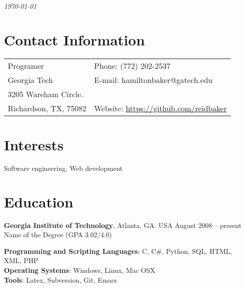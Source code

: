 \documentclass[margin,line]{res}
\begin{document}
 \hfill {\em \today}

\begin{resume}
\section{\sc Contact Information}

\vspace{.05in}
\begin{tabular}{@{}p{3.5in}p{3in}}
Programer             & {Phone:}  (772) 202-2537 \\
Georgia Tech
 & {E-mail:}  hamiltonbaker@gatech.edu\\
3205 Wareham Circle. \\
Richardson, TX, 75082  & {Website:} \url{https://github.com/reidbaker}
\end{tabular}


\section{\sc Interests}

Software engineering, Web development

\section{\sc Education}
{\bf Georgia Institute of Technology}, Atlanta, GA. USA \hfill August 2008 -- present\\

Name of the Degree \hfill(GPA 3.02/4.0)

{\bf Programming and Scripting Languages}:  C, C\#, Python, SQL, HTML, XML, PHP\\
{\bf Operating Systems}: Windows, Linux, Mac OSX\\
{\bf Tools}: Latex, Subversion, Git, Emacs \\

\end{resume}
\end{document}
